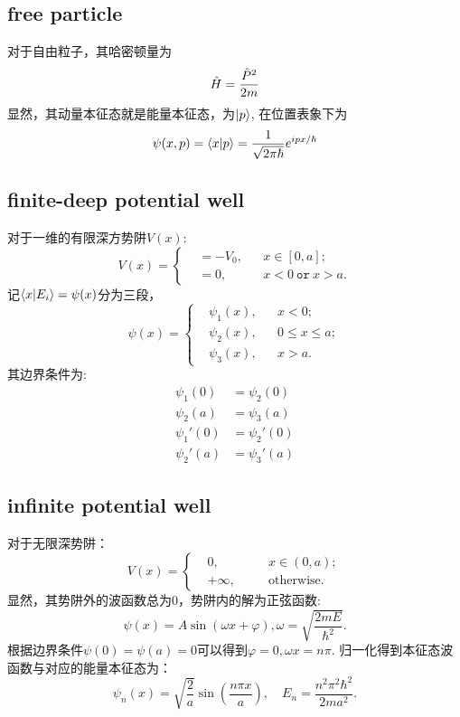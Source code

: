 \subsection{free particle}
对于自由粒子，其哈密顿量为
\begin{equation}
    \hat{H}=\frac{\hat{P}^2}{2m}
\end{equation}
显然，其动量本征态就是能量本征态，为$\left|p\right>$, 在位置表象下为
\begin{equation}
    \psi(x,p)=\left<x\middle|p\right>=\frac{1}{\sqrt{2\pi\hbar}} e^{ipx/\hbar}
\end{equation}
\subsection{finite-deep potential well}
对于一维的有限深方势阱$V(x)$:
\begin{equation}
    V(x)=\left\lbrace\begin{aligned}
        &=-V_0, && x\in[0,a];\\
        &=0, && x <0 \ \mathtt{or}\  x>a.
    \end{aligned}\right.
\end{equation}
记$\left<x\middle|E_i\right>=\psi(x)$分为三段，
\begin{equation}
    \psi(x)=\left\lbrace\begin{aligned}
        &\psi_1(x),&&x<0;\\
        &\psi_2(x),&&0\leq x\leq a;\\
        &\psi_3(x),&&x>a.
    \end{aligned}\right.
\end{equation}
其边界条件为: 
\begin{align}
    \psi_1(0)&=\psi_2(0)\\
    \psi_2(a)&=\psi_3(a)\\
    \psi_1'(0)&=\psi_2'(0)\\
    \psi_2'(a)&=\psi_3'(a)
\end{align}
\subsection{infinite potential well}
对于无限深势阱：
\begin{equation}
    V(x)=\left\lbrace
    \begin{aligned}
        &0, \quad && x\in(0,a);\\
        &+\infty, \quad && \text{otherwise.}
    \end{aligned}\right.
\end{equation}
显然，其势阱外的波函数总为0，势阱内的解为正弦函数:
\begin{equation}
    \psi(x)=A\sin(\omega x+\varphi), \omega=\sqrt{\frac{2mE}{\hbar^2}}.
\end{equation}
根据边界条件$\psi(0)=\psi(a)=0$可以得到$\varphi=0, \omega x=n\pi$.
归一化得到本征态波函数与对应的能量本征态为：
\begin{equation}
    \psi_n(x)=\sqrt{\frac{2}{a}}\sin\left(\frac{n\pi x}{a}\right), \quad E_n=\frac{n^2\pi^2\hbar^2}{2ma^2}.
\end{equation}
